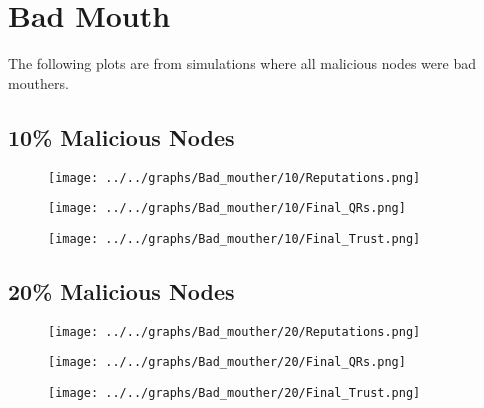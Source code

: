\section*{Bad Mouth}
The following plots are from simulations where all malicious nodes were
bad mouthers.
\\
\begin{minipage}[t]{0.49\columnwidth}
\subsection*{10\% Malicious Nodes}
    \begin{figure}[H]
        \centering
        \texttt{[image: ../../graphs/Bad\_mouther/10/Reputations.png]}
    \end{figure}
    \begin{figure}[H]
        \centering
        \texttt{[image: ../../graphs/Bad\_mouther/10/Final\_QRs.png]}
    \end{figure}
\end{minipage}
\begin{minipage}[t]{0.49\columnwidth}
    \begin{figure}[H]
        \centering
        \texttt{[image: ../../graphs/Bad\_mouther/10/Final\_Trust.png]}
    \end{figure}
\end{minipage}

\begin{minipage}[t]{0.49\columnwidth}
\subsection*{20\% Malicious Nodes}
    \begin{figure}[H]
        \centering
        \texttt{[image: ../../graphs/Bad\_mouther/20/Reputations.png]}
    \end{figure}
    \begin{figure}[H]
        \centering
        \texttt{[image: ../../graphs/Bad\_mouther/20/Final\_QRs.png]}
    \end{figure}
\end{minipage}
\begin{minipage}[t]{0.49\columnwidth}
    \begin{figure}[H]
        \centering
        \texttt{[image: ../../graphs/Bad\_mouther/20/Final\_Trust.png]}
    \end{figure}
\end{minipage}

